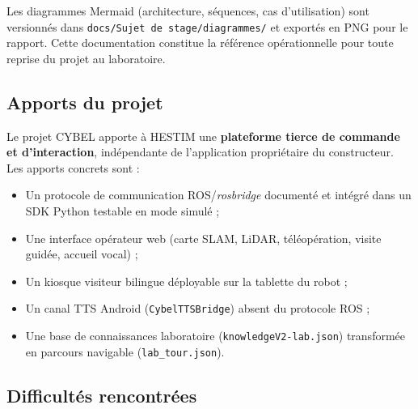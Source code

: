 Les diagrammes Mermaid (architecture, séquences, cas d'utilisation) sont
versionnés dans \texttt{docs/Sujet de stage/diagrammes/} et exportés en PNG
pour le rapport. Cette documentation constitue la référence opérationnelle pour
toute reprise du projet au laboratoire.


\subsection{Apports du projet}

Le projet CYBEL apporte à HESTIM une \textbf{plateforme tierce de commande et
d'interaction}, indépendante de l'application propriétaire du constructeur.
Les apports concrets sont :

\begin{itemize}
    \item Un protocole de communication ROS/\textit{rosbridge} documenté et
    intégré dans un SDK Python testable en mode simulé ;
    \item Une interface opérateur web (carte SLAM, LiDAR, téléopération, visite
    guidée, accueil vocal) ;
    \item Un kiosque visiteur bilingue déployable sur la tablette du robot ;
    \item Un canal TTS Android (\texttt{CybelTTSBridge}) absent du protocole ROS ;
    \item Une base de connaissances laboratoire (\texttt{knowledgeV2-lab.json})
    transformée en parcours navigable (\texttt{lab\_tour.json}).
\end{itemize}


\subsection{Difficultés rencontrées}


